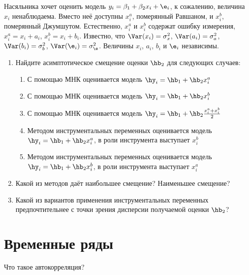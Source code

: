 \documentclass[pdftex,11pt,openany]{book}\usepackage[]{graphicx}\usepackage[]{color}
\begin{document}
\begin{problem}
Насяльника хочет оценить модель $y_i=\beta_1+\beta_2 x_i +\e_i$, к сожалению, величина $x_i$ ненаблюдаема. Вместо неё доступны  $x_i^a$, померянный Равшаном, и $x_i^b$, померянный Джумшутом. Естественно, $x_i^a$ и $x_i^b$ содержат ошибку измерения, $x_i^a=x_i+a_i$, $x_i^b=x_i+b_i$. Известно, что $\Var(x_i)=\sigma^2_x$, $\Var(a_i)=\sigma^2_a$,  $\Var(b_i)=\sigma^2_b$,  $\Var(\e_i)=\sigma^2_{\e}$. Величины $x_i$, $a_i$, $b_i$ и $\e_i$ независимы.

\begin{enumerate}
\item Найдите асимптотическое смещение оценки $\hb_2$ для следующих случаев:
\begin{enumerate}
\item С помощью МНК оценивается модель $\hy_i=\hb_1+\hb_2 x_i^a$
\item С помощью МНК оценивается модель $\hy_i=\hb_1+\hb_2 x_i^b$
\item С помощью МНК оценивается модель $\hy_i=\hb_1+\hb_2 \frac{x_i^a+x_i^b}{2}$
\item Методом инструментальных переменных оценивается модель $\hy_i=\hb_1+\hb_2 x_i^a$, в роли инструмента выступает $x_i^b$
\item Методом инструментальных переменных оценивается модель $\hy_i=\hb_1+\hb_2 x_i^b$, в роли инструмента выступает $x_i^a$
\end{enumerate}
\item Какой из методов даёт наибольшее смещение? Наименьшее смещение?
\item Какой из вариантов применения инструментальных переменных предпочтительнее с точки зрения дисперсии получаемой оценки $\hb_2$?
\end{enumerate}

\end{problem}


\begin{solution}
\end{solution}





\chapter{Временные ряды}


\begin{problem}
Что такое автокорреляция?
\end{problem}
\end{document}
